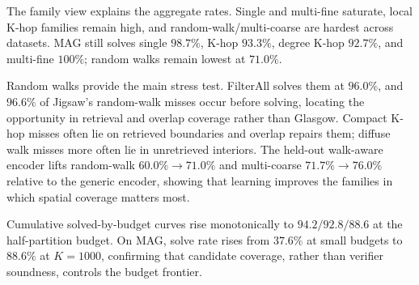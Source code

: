 \documentclass[runningheads]{llncs}
\begin{document}
\begin{table}[H]
\centering
\caption{\textbf{Jigsaw query-family breakdown.} Positive columns report exact-solve rate; negative columns report correct no-match rate. All three datasets use the connected-positive protocol. All datasets are reported at the matched half-partition budget ($K{=}10/100/1000$); the MAG rows use the deployed walk-aware encoder (overall $88.6\%$).}
\label{tab:jigsaw_family}
\setlength{\tabcolsep}{3pt}
\end{table}

\label{sec:family}
The family view explains the aggregate rates. Single and multi-fine saturate, local K-hop families remain high, and random-walk/multi-coarse are hardest across datasets. MAG still solves single $98.7\%$, K-hop $93.3\%$, degree K-hop $92.7\%$, and multi-fine $100\%$; random walks remain lowest at $71.0\%$.

Random walks provide the main stress test. FilterAll solves them at $96.0\%$, and $96.6\%$ of Jigsaw's random-walk misses occur before solving, locating the opportunity in retrieval and overlap coverage rather than Glasgow. Compact K-hop misses often lie on retrieved boundaries and overlap repairs them; diffuse walk misses more often lie in unretrieved interiors. The held-out walk-aware encoder lifts random-walk $60.0\%\!\to\!71.0\%$ and multi-coarse $71.7\%\!\to\!76.0\%$ relative to the generic encoder, showing that learning improves the families in which spatial coverage matters most.

Cumulative solved-by-budget curves rise monotonically to $94.2/92.8/88.6$ at the half-partition budget. On MAG, solve rate rises from $37.6\%$ at small budgets to $88.6\%$ at $K{=}1000$, confirming that candidate coverage, rather than verifier soundness, controls the budget frontier.
\end{document}
